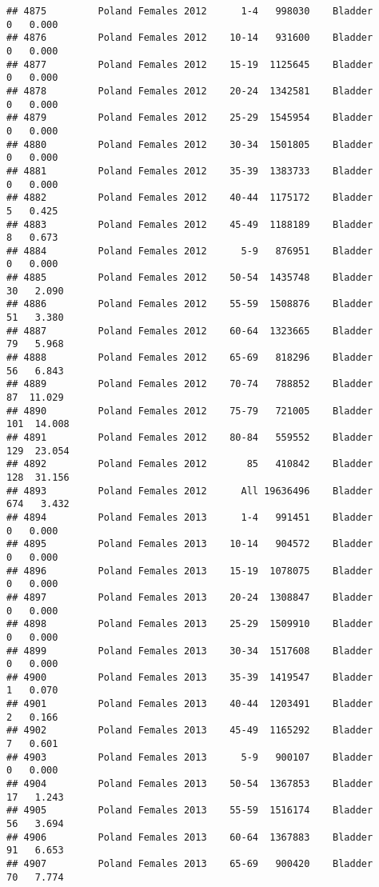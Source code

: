 \documentclass[
]{article}
\begin{document}
\begin{verbatim}
## 4875         Poland Females 2012      1-4   998030    Bladder      0   0.000
## 4876         Poland Females 2012    10-14   931600    Bladder      0   0.000
## 4877         Poland Females 2012    15-19  1125645    Bladder      0   0.000
## 4878         Poland Females 2012    20-24  1342581    Bladder      0   0.000
## 4879         Poland Females 2012    25-29  1545954    Bladder      0   0.000
## 4880         Poland Females 2012    30-34  1501805    Bladder      0   0.000
## 4881         Poland Females 2012    35-39  1383733    Bladder      0   0.000
## 4882         Poland Females 2012    40-44  1175172    Bladder      5   0.425
## 4883         Poland Females 2012    45-49  1188189    Bladder      8   0.673
## 4884         Poland Females 2012      5-9   876951    Bladder      0   0.000
## 4885         Poland Females 2012    50-54  1435748    Bladder     30   2.090
## 4886         Poland Females 2012    55-59  1508876    Bladder     51   3.380
## 4887         Poland Females 2012    60-64  1323665    Bladder     79   5.968
## 4888         Poland Females 2012    65-69   818296    Bladder     56   6.843
## 4889         Poland Females 2012    70-74   788852    Bladder     87  11.029
## 4890         Poland Females 2012    75-79   721005    Bladder    101  14.008
## 4891         Poland Females 2012    80-84   559552    Bladder    129  23.054
## 4892         Poland Females 2012       85   410842    Bladder    128  31.156
## 4893         Poland Females 2012      All 19636496    Bladder    674   3.432
## 4894         Poland Females 2013      1-4   991451    Bladder      0   0.000
## 4895         Poland Females 2013    10-14   904572    Bladder      0   0.000
## 4896         Poland Females 2013    15-19  1078075    Bladder      0   0.000
## 4897         Poland Females 2013    20-24  1308847    Bladder      0   0.000
## 4898         Poland Females 2013    25-29  1509910    Bladder      0   0.000
## 4899         Poland Females 2013    30-34  1517608    Bladder      0   0.000
## 4900         Poland Females 2013    35-39  1419547    Bladder      1   0.070
## 4901         Poland Females 2013    40-44  1203491    Bladder      2   0.166
## 4902         Poland Females 2013    45-49  1165292    Bladder      7   0.601
## 4903         Poland Females 2013      5-9   900107    Bladder      0   0.000
## 4904         Poland Females 2013    50-54  1367853    Bladder     17   1.243
## 4905         Poland Females 2013    55-59  1516174    Bladder     56   3.694
## 4906         Poland Females 2013    60-64  1367883    Bladder     91   6.653
## 4907         Poland Females 2013    65-69   900420    Bladder     70   7.774

\end{verbatim}
\end{document}
